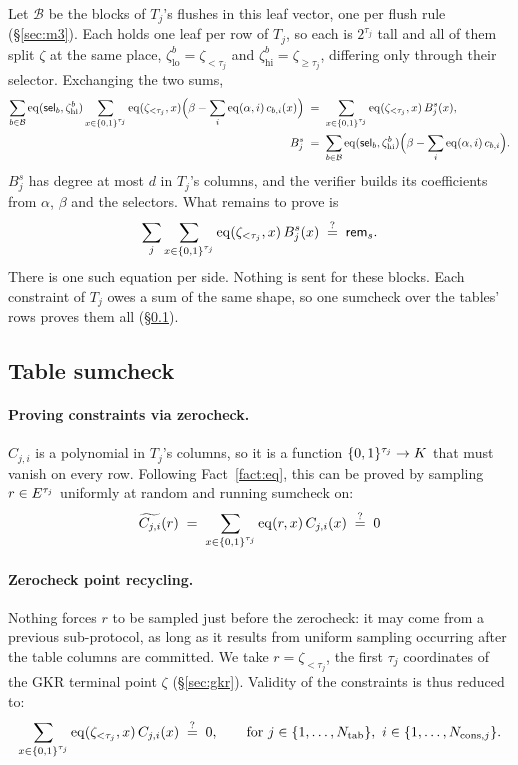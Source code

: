 Let $\mathcal B$ be the blocks of $T_j$'s flushes in this leaf vector, one per flush rule (\S\ref{sec:m3}). Each holds one leaf per row of $T_j$, so each is $2^{\tau_j}$ tall and all of them split $\zeta$ at the same place, $\zeta^{b}_{\mathrm{lo}}=\zeta_{<\tau_j}$ and $\zeta^{b}_{\mathrm{hi}}=\zeta_{\ge\tau_j}$, differing only through their selector. Exchanging the two sums,
\begin{align*}
  \sum_{b\in\mathcal B}\operatorname{eq}(\mathsf{sel}_b,\zeta^{b}_{\mathrm{hi}})\sum_{x\in\{0,1\}^{\tau_j}}\operatorname{eq}(\zeta_{<\tau_j},x)\Bigl(\beta-\sum_{i}\operatorname{eq}(\alpha,i)\,c_{b,i}(x)\Bigr)
  &\;=\;\sum_{x\in\{0,1\}^{\tau_j}}\operatorname{eq}(\zeta_{<\tau_j},x)\,B^{s}_j(x),\\
  B^{s}_j&\;=\;\sum_{b\in\mathcal B}\operatorname{eq}(\mathsf{sel}_b,\zeta^{b}_{\mathrm{hi}})\Bigl(\beta-\sum_i\operatorname{eq}(\alpha,i)\,c_{b,i}\Bigr).
\end{align*}
$B^{s}_j$ has degree at most $d$ in $T_j$'s columns, and the verifier builds its coefficients from $\alpha$, $\beta$ and the selectors. What remains to prove is
\[
  \sum_j\sum_{x\in\{0,1\}^{\tau_j}}\operatorname{eq}(\zeta_{<\tau_j},x)\,B^{s}_j(x)\;\stackrel{?}{=}\;\mathsf{rem}_{s} .
\]
There is one such equation per side. Nothing is sent for these blocks. Each constraint of $T_j$ owes a sum of the same shape, so one sumcheck over the tables' rows proves them all (\S\ref{sec:air}).

\subsection{Table sumcheck}\label{sec:air}

\paragraph{Proving constraints via zerocheck.} $C_{j,i}$ is a polynomial in $T_j$'s columns, so it is a function $\{0,1\}^{\tau_j}\to K$ that must vanish on every row. Following Fact~\ref{fact:eq}, this can be proved by sampling $r\in E^{\tau_j}$ uniformly at random and running sumcheck on:
\[
  \widetilde{C_{j,i}}(r)\;=\;\sum_{x\in\{0,1\}^{\tau_j}}\operatorname{eq}(r,x)\,C_{j,i}(x)\;\stackrel{?}{=}\;0
\]

\paragraph{Zerocheck point recycling.} Nothing forces $r$ to be sampled just before the zerocheck: it may come from a previous sub-protocol, as long as it results from uniform sampling occurring after the table columns are committed. We take $r=\zeta_{<\tau_j}$, the first $\tau_j$ coordinates of the GKR terminal point $\zeta$ (\S\ref{sec:gkr}). Validity of the constraints is thus reduced to:
\begin{equation}\label{eq:cons}
  \sum_{x\in\cube{\tau_j}}\eq(\zeta_{<\tau_j},x)\,C_{j,i}(x)\;\qeq\;0,
  \qquad \text{for } j\in\{1,\dots,\ntab\},\ i\in\{1,\dots,\ncons{j}\}.
\end{equation}

